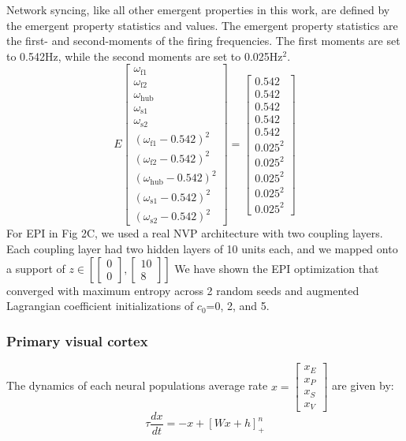 \documentclass[11pt]{article}
\begin{document}
Network syncing, like all other emergent properties in this work, are defined by the emergent property statistics and values.  The emergent property statistics are the first- and second-moments of the firing frequencies. The first moments are set to 0.542Hz, while the second moments are set to 0.025Hz$^2$.
\begin{equation}
E \begin{bmatrix} \omega_{\text{f1}} \\ \omega_{\text{f2}} \\ \omega_{\text{hub}} \\ \omega_{\text{s1}} \\ \omega_{\text{s2}} \\ (\omega_{\text{f1}} - 0.542)^2 \\ (\omega_{\text{f2}} - 0.542)^2 \\ (\omega_{\text{hub}} - 0.542)^2 \\ (\omega_{\text{s1}} - 0.542)^2 \\ (\omega_{\text{s2}} - 0.542)^2  \end{bmatrix} = \begin{bmatrix} 0.542 \\ 0.542 \\ 0.542 \\ 0.542 \\ 0.542 \\ 0.025^2 \\ 0.025^2 \\ 0.025^2 \\ 0.025^2 \\ 0.025^2 \end{bmatrix}
\end{equation}
For EPI in Fig 2C, we used a real NVP architecture with two coupling layers.  Each coupling layer had two hidden layers of 10 units each, and we mapped onto a support of $z \in \left[ \begin{bmatrix} 0 \\ 0 \end{bmatrix}, \begin{bmatrix} 10 \\ 8 \end{bmatrix} \right]$  We have shown the EPI optimization that converged with maximum entropy across 2 random seeds and augmented Lagrangian coefficient initializations of $c_0$=0, 2, and 5.

\subsubsection{Primary visual cortex}\label{methods_V1}
The dynamics of each neural populations average rate
$x = \begin{bmatrix} x_E \\ x_P \\ x_S \\ x_V \end{bmatrix}$
are given by:
\begin{equation}
\tau \frac{dx}{dt} = -x + [W x+ h]_+^n
\end{equation}
\end{document}

